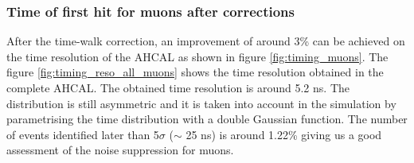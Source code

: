 \subsubsection{Time of first hit for muons after corrections}
\label{subsec:Muon_final}

After the time-walk correction, an improvement of around 3\% can be achieved on the time resolution of the AHCAL as shown in figure \ref{fig:timing_muons}. The figure \ref{fig:timing_reso_all_muons} shows the time resolution obtained in the complete AHCAL. The obtained time resolution is around 5.2 ns. The distribution is still asymmetric and it is taken into account in the simulation by parametrising the time distribution with a double Gaussian function. The number of events identified later than 5$\sigma$ ($\sim$ 25 ns) is around 1.22\% giving us a good assessment of the noise suppression for muons.

